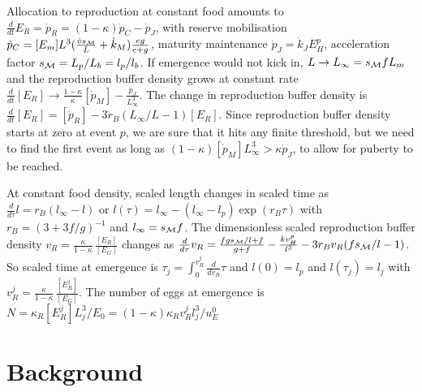\documentclass{article}
\begin{document}
Allocation to reproduction at constant food amounts to $\frac{d} {dt} E_R = \dot{p}_R =  (1 - \kappa) \dot{p}_C  - \dot{p}_J $, with reserve mobilisation $\dot{p}_C = [E_m] L^3 (\frac{\dot{v} s_{\cal M}} {L} + \dot{k}_M) \frac{e g} {e + g}$, maturity maintenance $\dot{p}_J = \dot{k}_J E_H^p$, acceleration factor $s_{\cal M} = L_p/ L_b = l_p/ l_b$.
If emergence would not kick in, $L \rightarrow L_\infty = s_{\cal M} f L_m$ and the reproduction buffer density grows at constant rate $\frac{d} {dt} [E_R] \rightarrow \frac{1 - \kappa} {\kappa} [\dot{p}_M] - \frac{\dot{p}_J} {L_\infty^3}$. 
The change in reproduction buffer density is $\frac{d} {dt} [E_R] = [\dot{p}_R] - 3 \dot{r}_B (L_\infty/ L - 1) [E_R]$.
Since reproduction buffer density starts at zero at event $p$, we are sure that it hits any finite threshold, but we need to find the first event as long as $(1 - \kappa) [\dot{p}_M] L_\infty^3 > \kappa \dot{p}_J$, to allow for puberty to be reached.

At constant food density, scaled length changes in scaled time as $\frac{d} {d \tau} l = r_B(l_\infty - l)$ or $l(\tau) = l_\infty - (l_\infty - l_p) \exp(r_B \tau)$ with $r_B = (3 + 3 f/g)^{-1}$ and $l_\infty = s_{\cal M} f$.
The dimensionless scaled reproduction buffer density $v_R = \frac{\kappa} {1 - \kappa} \, \frac{[E_R]} {[E_G]}$ changes as 
$\frac{d} {d \tau} v_R = \frac{f g s_{\cal M}/ l + f} {g + f} - \frac{k v_H^p} {l^3} - 3 r_B v_R (f s_{\cal M} / l - 1)$.
So scaled time at emergence is $\tau_j = \int_0^{v_R^j} \frac{d} {d v_R} \tau$ and $l(0) = l_p$ and $l(\tau_j) = l_j$ with  $v_R^j = \frac{\kappa} {1 - \kappa} \, \frac{[E_R^j]} {[E_G]}$. 
The number of eggs at emergence is $N = \kappa_R [E_R^j] L_j^3/ E_0 = (1 - \kappa) \kappa_R v_R^j l_j^3/ u_E^0$




\section{Background}







\end{document}
